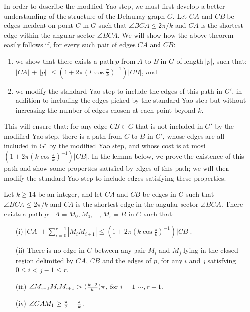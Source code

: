 \documentclass{stacs_proc}
\theoremstyle{plain}\newtheorem{satz}[thm]{Satz}
\begin{document}
In order to describe the modified Yao step, we must first develop a
better understanding of the structure of the Delaunay graph $G$. Let
$CA$ and $CB$ be edges incident on point $C$ in $G$ such that
$\angle{BCA} \leq 2\pi/k$ and $CA$ is the shortest edge within the
angular sector $\angle{BCA}$. We will show how the above theorem easily
follows if, for every such pair of edges $CA$ and $CB$:
\begin{enumerate}

\item we show that there exists a path $p$ from $A$ to $B$ in $G$ of length $|p|$,
such that:\\ $|CA|$ $+$ $|p|$ $\leq (1+2\pi(k\cos{\frac{\pi}{k}})^{-1})|CB|$, and

\item we modify the standard Yao step to include the edges of this
path in $G'$, in addition to including the edges picked by the
standard Yao step but without increasing the number of edges chosen at each
point beyond $k$.
\end{enumerate}
This will ensure that: for any edge $CB \in G$ that is not included in $G'$
by the modified Yao step, there is a path from $C$ to $B$ in $G'$, whose
edges are all included in $G'$ by the modified Yao step, and whose cost is
at most $(1+2\pi(k\cos{\frac{\pi}{k}})^{-1})|CB|$. In the lemma below, we prove
the existence of this path and show some properties satisfied by edges of this
path; we will then modify the standard Yao step to include edges satisfying
these properties.
\begin{lemma}
\label{canpath} Let $k \geq 14$ be an integer, and let $CA$ and $CB$
be edges in $G$ such that $\angle{BCA} \leq 2\pi/k$ and $CA$ is the
shortest edge in the angular sector $\angle{BCA}$. There exists a
path $p:$~$A = M_0, M_1, ..., M_r = B$ in $G$ such that:

\begin{itemize}
\item[(i)] $|CA|+\sum_{i=0}^{r-1}|M_iM_{i+1}| \leq
(1+2\pi(k\cos{\frac{\pi}{k}})^{-1})|CB|$.
\item[(ii)] There is no edge in $G$ between any pair $M_i$ and $M_j$ lying in the closed region delimited by
$CA$, $CB$ and the edges of $p$, for any $i$ and $j$
satisfying $0 \leq i < j-1 \leq r$.
\item[(iii)] $\angle{M_{i-1}M_iM_{i+1}} > ({{k - 2} \over k})\pi$, for $i = 1,\cdots,
r-1$.
\item[(iv)] $\angle{CAM_1} \geq {\pi \over 2} - {\frac{\pi}{k}}$.
\end{itemize}
\end{lemma}
\end{document}
